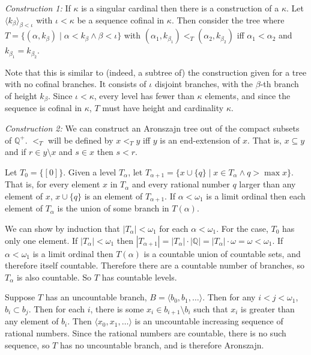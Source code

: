 \documentclass[12pt]{article}
\begin{document}
\emph{Construction 1:} If $\kappa$ is a singular cardinal then there is a  construction of a $\kappa$.  Let $\langle k_\beta\rangle_{\beta<\iota}$ with $\iota<\kappa$ be a sequence cofinal in $\kappa$.  Then consider the tree where $T=\{(\alpha,k_\beta)\mid \alpha<k_\beta \wedge \beta<\iota\}$ with $(\alpha_1,k_{\beta_1})<_T(\alpha_2,k_{\beta_2})$ iff $\alpha_1<\alpha_2$ and $k_{\beta_1}=k_{\beta_2}$.

Note that this is similar to (indeed, a subtree of) the construction given for a tree with no cofinal branches.  It consists of $\iota$ disjoint branches, with the $\beta$-th branch of height $k_\beta$.  Since $\iota<\kappa$, every level has fewer than $\kappa$ elements, and since the sequence is cofinal in $\kappa$, $T$ must have height and cardinality $\kappa$.

\emph{Construction 2:} We can construct an Aronszajn tree out of the compact subsets of $\mathbb{Q}^+$.  $<_T$ will be defined by $x<_T y$ iff $y$ is an end-extension of $x$.  That is, $x\subseteq y$ and if $r\in y\setminus x$ and $s\in x$ then $s<r$.

Let $T_0=\{[0]\}$.  Given a level $T_\alpha$, let $T_{\alpha+1}=\{x\cup\{q\}\mid x\in T_\alpha \wedge q>\operatorname{max} x\}$.  That is, for every element $x$ in $T_\alpha$ and every rational number $q$ larger than any element of $x$, $x\cup \{q\}$ is an element of $T_{\alpha+1}$.  If $\alpha<\omega_1$ is a limit ordinal then each element of $T_\alpha$ is the union of some branch in $T(\alpha)$.

We can show by induction that $|T_\alpha|<\omega_1$ for each $\alpha<\omega_1$.  For the  case, $T_0$ has only one element.  If $|T_\alpha|<\omega_1$ then $|T_{\alpha+1}|=|T_{\alpha}|\cdot |\mathbb{Q}|=|T_{\alpha}|\cdot\omega=\omega<\omega_1$.  If $\alpha<\omega_1$ is a limit ordinal then $T(\alpha)$ is a countable union of countable sets, and therefore itself countable.  Therefore there are a countable number of branches, so $T_\alpha$ is also countable.  So $T$ has countable levels.

Suppose $T$ has an uncountable branch, $B=\langle b_0,b_1,\ldots\rangle$.  Then for any $i<j<\omega_1$, $b_i\subset b_j$.  Then for each $i$, there is some $x_i\in b_{i+1}\setminus b_i$ such that $x_i$ is greater than any element of $b_i$.  Then $\langle x_0,x_1,\ldots\rangle$ is an uncountable increasing sequence of rational numbers.  Since the rational numbers are countable, there is no such sequence, so $T$ has no uncountable branch, and is therefore Aronszajn.
\end{document}
